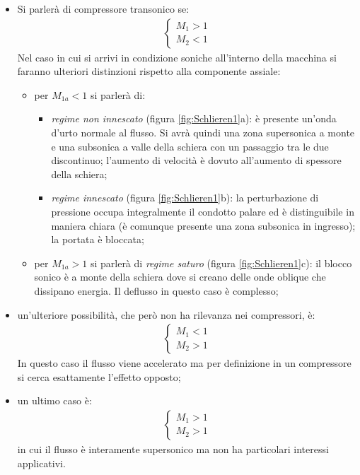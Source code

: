 \begin{itemize}
	\item Si parlerà di compressore transonico se:
	\begin{align*}
	\begin{cases}
	M_1 >1\\
	M_2 <1
	\end{cases}
	\end{align*} 
	Nel caso in cui si arrivi in condizione soniche all'interno della macchina si faranno ulteriori distinzioni rispetto alla componente assiale: 
	\begin{itemize}
		\item per $M_{1a} < 1 $ si parlerà di:
		\begin{itemize}
			\item \textit{regime non innescato} (figura \ref{fig:Schlieren1}a): è presente un'onda d'urto normale al flusso. Si avrà quindi una zona supersonica a monte e una subsonica a valle della schiera con un passaggio tra le due discontinuo; l'aumento di velocità è dovuto all'aumento di spessore della schiera;
			\item \textit{regime innescato} (figura \ref{fig:Schlieren1}b): la perturbazione di pressione occupa integralmente il condotto palare ed è distinguibile in maniera chiara (è comunque presente una zona subsonica in ingresso); la portata è bloccata; 
		\end{itemize}
		\item per $ M_{1a} > 1 $ si parlerà di \textit{regime saturo} (figura \ref{fig:Schlieren1}c): il blocco sonico è a monte della schiera dove si creano delle onde oblique che dissipano energia. Il deflusso in questo caso è complesso;
	\end{itemize}
	\item un'ulteriore possibilità, che però non ha rilevanza nei compressori, è:
	\begin{align*}
	\begin{cases}
	M_1 <1\\
	M_2 >1
	\end{cases}
	\end{align*} 
	In questo caso il flusso viene accelerato ma per definizione in un compressore si cerca esattamente l'effetto opposto;
	\item un ultimo caso è:
	\begin{align*}
	\begin{cases}
	M_1 >1\\
	M_2 >1
	\end{cases}
	\end{align*} 
	in cui il flusso è interamente supersonico ma non ha particolari interessi applicativi.
\end{itemize}
